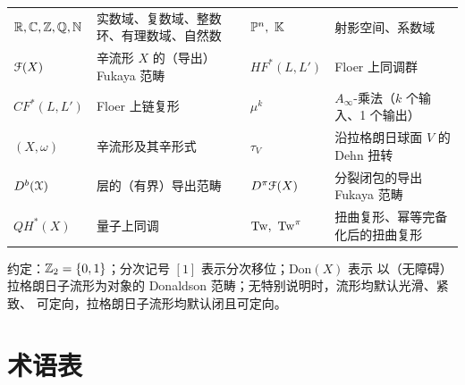 \begin{center}
\small
\begin{tabular}{@{}p{}p{}p{}p{}@{}}
\toprule
$\mathbb{R},\mathbb{C},\mathbb{Z},\mathbb{Q},\mathbb{N}$ & 实数域、复数域、整数环、有理数域、自然数 & $\bP^n,\ \bK$ & 射影空间、系数域 \\
$\EuScript{F}(X)$ & 辛流形 $X$ 的（导出）Fukaya 范畴 & $HF^*(L,L')$ & Floer 上同调群 \\
$CF^*(L,L')$ & Floer 上链复形 & $\mu^k$ & $A_\infty$-乘法（$k$ 个输入、1 个输出） \\
$(X,\omega)$ & 辛流形及其辛形式 & $\tau_V$ & 沿拉格朗日球面 $V$ 的 Dehn 扭转 \\
$D^b(\EuScript{X})$ & 层的（有界）导出范畴 & $D^{\pi}\EuScript{F}(X)$ & 分裂闭包的导出 Fukaya 范畴 \\
$QH^*(X)$ & 量子上同调 & $\Tw,\ \Tw^{\pi}$ & 扭曲复形、幂等完备化后的扭曲复形 \\
\bottomrule
\end{tabular}
\end{center}

\noindent 约定：$\mathbb{Z}_2=\{0,1\}$；分次记号 $[1]$ 表示分次移位；$\mathrm{Don}(X)$ 表示
以（无障碍）拉格朗日子流形为对象的 Donaldson 范畴；无特别说明时，流形均默认光滑、紧致、
可定向，拉格朗日子流形均默认闭且可定向。

\clearpage

\section*{术语表}

